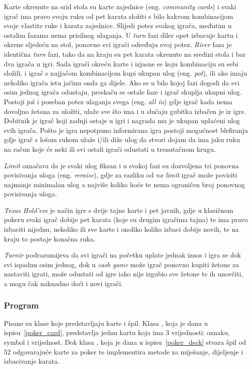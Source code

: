 Karte okrenute na srid stola su karte zajednice (eng. \textit{community cards}) i svaki igrač ima pravo svoju ruku od pet karata složiti s bilo kakvom kombinacijom svoje vlastite ruke i karata zajednice. Slijedi potez svakog igrača, međutim u ostalim fazama nema prisilnog ulaganja. U \emph{turn} fazi diler opet izbacuje kartu i okrene sljedeću na stol, ponovno svi igrači određuju svoj potez. \emph{River} faza je identična \emph{turn} fazi, tako da na kraju su pet karata okrenute na sredini stola i bar dva igrača u igri. Sada igrači okreću karte i izjasne se koju kombinaciju su sebi složili, i igrač s najjačom kombinacijom kupi ukupan ulog (eng. \textit{pot}), ili ako imaju nekoliko igrača istu jačinu onda ga dijele. Ako se u bilo kojoj fazi dogodi da svi osim jednog igrača odustaju, preskaču se ostale faze i igrač skuplja ukupni ulog. Postoji još i poseban potez ulaganja svega (eng. \textit{all in}) gdje igrač kada nema dovoljno žetona za uložiti, ulaže sve što ima i u slučaju gubitka izbačen je iz igre. Dobitnik je igrač koji zadnji ostaje u igri i nagrada mu je ukupan uplaćeni ulog svih igrača. Pošto je igra nepotpuno informirana igra postoji mogućnost blefiranja gdje igrač s lošom rukom ulaže i/ili diže ulog da stvori dojam da ima jaku ruku na račun koje će neki ili svi ostali igrači odustati u trenutačnom krugu.


\emph{Limit} označava da je svaki ulog fiksan i u svakoj fazi su dozvoljena tri ponovna povisivanja uloga (eng. \textit{reraise}), gdje za razliku od \emph{no limit} igrač može povisiti najmanje minimalan ulog a najviše koliko hoće te nema ograničen broj ponovnog povisivanja uloga.

\emph{Texas Hold'em} je način igre s dvije tajne karte i pet javnih, gdje u klasičnom pokeru svaki igrač dobije pet karata (koje su drugim igračima tajna) te ima pravo izbaciti nijednu, nekoliko ili sve karte i onoliko koliko izbaci dobije novih, te na kraju to postaje konačna ruka.

\emph{Turnir} podrazumijeva da svi igrači na početku uplate jednak iznos i igra se dok svi ispadnu osim jednog, dok u \emph{cash game} može igrač ponovno kupiti žetone za nastaviti igrati, može odustati od igre 
iako nije izgubio sve žetone te ih unovčiti, a mogu čak naknadno doći i novi igrači.

\subsubsection{Program}
Pisane su klase koje predstavljaju karte i špil. Klasa , koja je dana u ispisu~\ref{poker_card}, predstavlja jednu kartu koja ima 3 vrijednosti: oznaku, symbol i vrijednost. Dok klasa , koja je dana u ispisu~\ref{poker_deck} stvara špil od 52 odgovarajuće karte za poker te implementira metode za miješanje, dijeljenje i izbacivanje karata.


